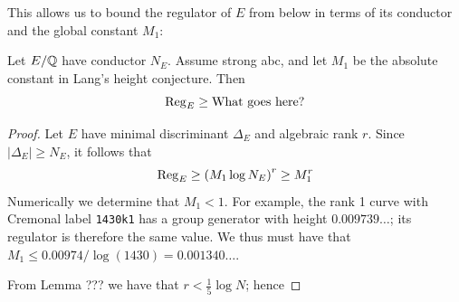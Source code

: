 \documentclass[10pt]{article}
\begin{document}
This allows us to bound the regulator of $E$ from below in terms of its conductor and the global constant $M_1$:
\begin{theorem}
Let $E/\mathbb{Q}$ have conductor $N_E$. Assume strong abc, and let $M_1$ be the absolute constant in Lang's height conjecture. Then
\begin{equation}
\operatorname{Reg}_E \ge \text{What goes here?}
\end{equation}
\end{theorem}
\begin{proof}
Let $E$ have minimal discriminant $\Delta_E$ and algebraic rank $r$. Since $|\Delta_E|\ge N_E$, it follows that 
\begin{equation*}
\operatorname{Reg}_E \ge \left(M_1 \log N_E \right)^r \ge M_1^r
\end{equation*}
Numerically we determine that $M_1 < 1$. For example, the rank 1 curve with Cremonal label {\tt 1430k1} has a group generator with height $0.009739\ldots$; its regulator is therefore the same value. We thus must have that $M_1 \le 0.00974/\log(1430) = 0.001340\ldots$.

From Lemma ??? we have that $r < \frac{1}{5}\log N$; hence 

\end{proof}









{}

\end{document}
